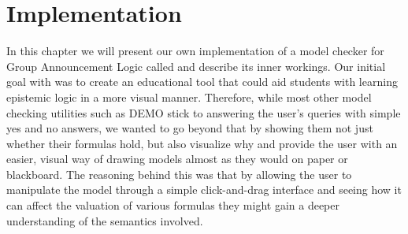 \section{Implementation}\label{sec:impl}








In this chapter we will present our own implementation of a model checker for Group Announcement Logic called \cname{} and describe its inner workings. Our initial goal with \cname{} was to create an educational tool that could aid students with learning epistemic logic in a more visual manner. Therefore, while most other model checking utilities such as DEMO \cite{JanvanEijck} stick to answering the user's queries with simple yes and no answers, we wanted to go beyond that by showing them not just whether their formulas hold, but also visualize why and provide the user with an easier, visual way of drawing models almost as they would on paper or blackboard. The reasoning behind this was that by allowing the user to manipulate the model through a simple click-and-drag interface and seeing how it can affect the valuation of various formulas they might gain a deeper understanding of the semantics involved.

